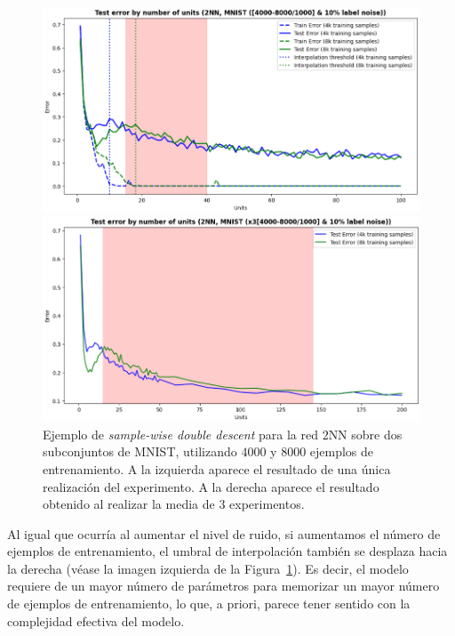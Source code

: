 \begin{figure}[h!]
    \centering
    \begin{minipage}{0.49\textwidth}
        \centering
        \includegraphics[width=\linewidth]{img/experiments/sample-wise-dd1.png}
    \end{minipage}
    \hfill
    \begin{minipage}{0.49\textwidth}
        \centering
        \includegraphics[width=\linewidth]{img/experiments/sample-wise-dd2.png}
    \end{minipage}
    \caption[Ejemplo de \textit{sample-wise double descent}.]{Ejemplo de \textit{sample-wise double descent} para la red $2$NN sobre dos subconjuntos de MNIST, utilizando $4000$ y $8000$ ejemplos de entrenamiento. A la izquierda aparece el resultado de una única realización del experimento. A la derecha aparece el resultado obtenido al realizar la media de $3$ experimentos.}
    \label{fig:swdd}
\end{figure}

Al igual que ocurría al aumentar el nivel de ruido, si aumentamos el número de ejemplos de entrenamiento, el umbral de interpolación también se desplaza hacia la derecha (véase la imagen izquierda de la Figura~\ref{fig:swdd}). Es decir, el modelo requiere de un mayor número de parámetros para memorizar un mayor número de ejemplos de entrenamiento, lo que, a priori, parece tener sentido con la complejidad efectiva del modelo.\newline

